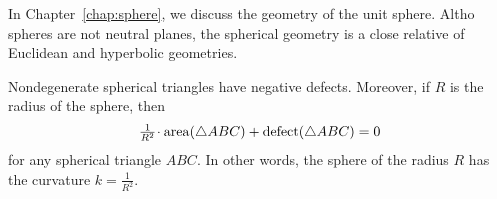 \medskip

In Chapter~\ref{chap:sphere},
we discuss the geometry of the unit sphere.
Altho spheres are not neutral planes,
the spherical geometry is a close relative of Euclidean and hyperbolic geometries.

Nondegenerate spherical triangles have negative defects.
Moreover, 
if $R$ is the radius of the sphere, then
$$\tfrac1{R^2}\cdot\area(\triangle ABC)+\defect(\triangle ABC)=0$$
for any spherical triangle $ABC$.
In other words, 
the sphere of the radius $R$ has the curvature $k=\tfrac1{R^2}$.


